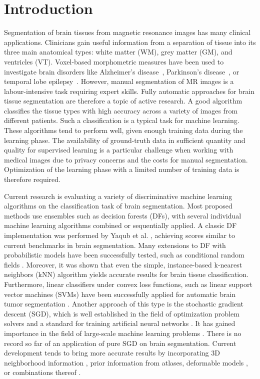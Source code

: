 \documentclass[journal]{IEEEtran}
\begin{document}
\section{Introduction}\label{s.introduction}
Segmentation of brain tissues from magnetic resonance images has many clinical applications. Clinicians gain useful information from a separation of tissue into its three main anatomical types: white matter (WM), grey matter (GM), and ventricles (VT). Voxel-based morphometric measures have been used to investigate brain disorders like Alzheimer’s disease~\cite{busatto2003voxel}, Parkinson's disease~\cite{price2004voxel}, or temporal lobe epilepsy~\cite{rummel2017personalized}. However, manual segmentation of MR images is a labour-intensive task requiring expert skills. Fully automatic approaches for brain tissue segmentation are therefore a topic of active research. A good algorithm classifies the tissue types with high accuracy across a variety of images from different patients. Such a classification is a typical task for machine learning. These algorithms tend to perform well, given enough training data during the learning phase. The availability of ground-truth data in sufficient quantity and quality for supervised learning is a particular challenge when working with medical images due to privacy concerns and the costs for manual segmentation. Optimization of the learning phase with a limited number of training data is therefore required.

Current research is evaluating a variety of discriminative machine learning algorithms on the classification task of brain segmentation. Most proposed methods use ensembles such as decision forests (DFs), with several individual machine learning algorithms combined or sequentially applied. A classic DF implementation was performed by Yaqub et al. \cite{Yaqub2014}, achieving scores similar to current benchmarks in brain segmentation. Many extensions to DF with probabilistic models have been successfully tested, such as conditional random fields \cite{Pereira2016}. Moreover, it was shown that even the simple, instance-based k-nearest neighbors (kNN) algorithm yields accurate results \cite{Anbeek2004,Cocosco2003,Warfield2000} for brain tissue classification. Furthermore, linear classifiers under convex loss functions, such as linear support vector machines (SVMs) have been successfully applied for automatic brain tumor segmentation \cite{Bauer2011}. Another approach of this type is the stochastic gradient descent (SGD), which is well established in the field of optimization problem solvers and a standard for training artificial neural networks \cite{LeCun1998}. It has gained importance in the field of large-scale machine learning problems \cite{Bottou2010}. There is no record so far of an application of pure SGD on brain segmentation. Current development tends to bring more accurate results by incorporating 3D neighborhood information \cite{Li2011,Despotovic2013}, prior information from atlases\cite{Pohl2006,Ashburner2005}, deformable models \cite{Moreno2014}, or combinations thereof \cite{Ortiz2014}.
\end{document}
